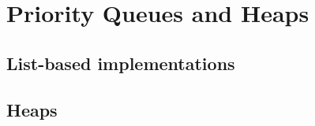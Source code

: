 \chapter{Priority Queues and Heaps}
\label{chap:pqueues}

\section{List-based implementations}

\section{Heaps}